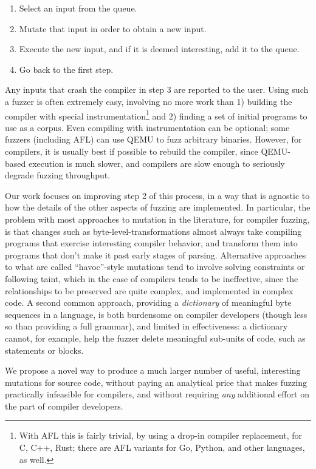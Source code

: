 \begin{enumerate}
\item Select an input from the queue.
\item Mutate that input in order to obtain a new input.
\item Execute the new input, and if it is deemed interesting, add it to the queue.
\item Go back to the first step.
\end{enumerate}

Any inputs that crash the compiler in step 3 are reported to the user.  Using such a fuzzer is often extremely easy, involving no more work than 1) building the compiler with special instrumentation\footnote{With AFL this is fairly trivial, by using a drop-in compiler replacement, for C, C++, Rust; there are AFL variants for Go, Python, and other languages, as well.} and 2) finding a set of initial programs to use as a corpus.  Even compiling with instrumentation can be optional; some fuzzers (including AFL) can use QEMU to fuzz arbitrary binaries.  However, for compilers, it is usually best if possible to rebuild the compiler, since QEMU-based execution is much slower, and compilers are slow enough to seriously degrade fuzzing throughput.


Our work focuses on improving step 2 of this process, in a way that is agnostic to how the details of the other aspects of fuzzing are implemented.  In particular, the problem with most approaches to mutation in the literature, for compiler fuzzing, is that changes such as byte-level-transformations almost always take compiling programs that exercise interesting compiler behavior, and transform them into programs that don't make it past early stages of parsing.  Alternative approaches to what are called ``havoc''-style mutations tend to involve solving constraints or following taint, which in the case of compilers tends to be ineffective, since the relationships to be preserved are quite complex, and implemented in complex code.  A second common approach, providing a \emph{dictionary} of meaningful byte sequences in a language, is both burdensome on compiler developers (though less so than providing a full grammar), and limited in effectiveness: a dictionary cannot, for example, help the fuzzer delete meaningful sub-units of code, such as statements or blocks.

We propose a novel way to produce a much larger number of useful, interesting mutations for source code, without paying an analytical price that makes fuzzing practically infeasible for compilers, and without requiring \emph{any} additional effort on the part of compiler developers.


